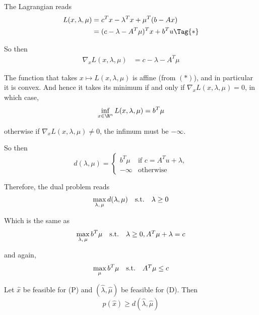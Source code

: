 The Lagrangian reads
\begin{align*}
	L(x,\lambda,\mu)
	 & =c^Tx-\lambda^Tx+\mu^T(b-Ax)         \\
	 & =(c-\lambda-A^T\mu)^Tx + b^Tu\Tag{*}
\end{align*}


So then
\begin{align*}
	\nabla_xL(x,\lambda,\mu)
	 & =c-\lambda-A^T\mu
\end{align*}

The function that takes $x\mapsto L(x,\lambda,\mu)$ is affine (from
$(*)$), and in particular it is convex. And hence it takes its minimum
if and only if $\nabla_xL(x,\lambda,\mu)=0$, in which case,
$$
	\inf_{x\in\R^n}L(x,\lambda,\mu)=b^T\mu
$$

otherwise if $\nabla_xL(x,\lambda,\mu)\neq0$, the infimum must be
$-\infty$.

So then
$$
	d(\lambda,\mu)=\begin{cases}
		b^T\mu  & \text{if }c=A^Tu+\lambda, \\
		-\infty & \text{otherwise}
	\end{cases}
$$

Therefore, the dual problem reads
$$\begin{array}{l l l}\displaystyle
		\max_{\lambda,\,\mu}d(\lambda,\mu) & \text{s.t.} & \lambda\geq0
	\end{array}$$

Which is the same as
$$\begin{array}{l l l}\displaystyle
		\max_{\lambda,\,\mu}b^T\mu & \text{s.t.} & \lambda\geq0,A^T\mu+\lambda=c
	\end{array}$$

and again,
$$\begin{array}{l l l}\displaystyle
		\max_\mu b^T\mu & \text{s.t.} & A^T\mu\leq c
	\end{array}$$


\label{ad0b792}

Let $\hat x$ be feasible for (P) and $(\hat\lambda,\hat\mu)$ be
feasible for (D). Then
$$
	p(\hat x)\geq d(\hat\lambda,\hat\mu)
$$

